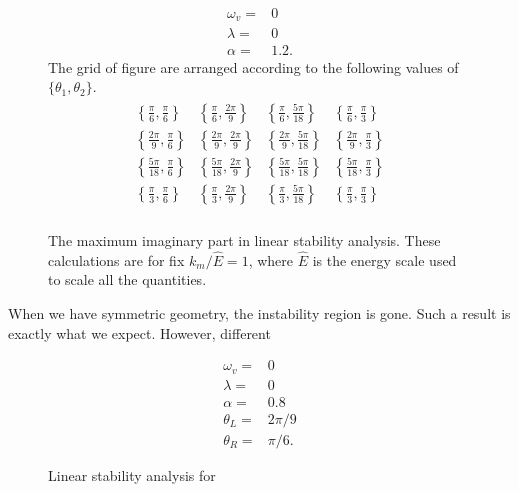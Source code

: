 \documentclass[letterpaper,12pt,english]{sphinxmanual}
\begin{document}
\begin{figure}[htbp]
\centering
\capstart

\noindent{}
\caption{The maximum imaginary part in linear stability analysis. These calculations are for fix \(k_m/\hat E=1\), where \(\hat E\) is the energy scale used to scale all the quantities.}{\small \begin{equation*}
\begin{split}\omega_v =& 0\\
\lambda =& 0\\
\alpha = & 1.2.\end{split}
\end{equation*}
The grid of figure are arranged according to the following values of \(\{\theta_1,\theta_2\}\).
\begin{equation*}
\begin{split}\begin{array}{cccc}
\left\{\frac{\pi }{6},\frac{\pi }{6}\right\} & \left\{\frac{\pi }{6},\frac{2 \pi }{9}\right\} & \left\{\frac{\pi }{6},\frac{5 \pi }{18}\right\} & \left\{\frac{\pi }{6},\frac{\pi }{3}\right\} \\
\left\{\frac{2 \pi }{9},\frac{\pi }{6}\right\} & \left\{\frac{2 \pi }{9},\frac{2 \pi }{9}\right\} & \left\{\frac{2 \pi }{9},\frac{5 \pi }{18}\right\} & \left\{\frac{2 \pi }{9},\frac{\pi }{3}\right\} \\
\left\{\frac{5 \pi }{18},\frac{\pi }{6}\right\} & \left\{\frac{5 \pi }{18},\frac{2 \pi }{9}\right\} & \left\{\frac{5 \pi }{18},\frac{5 \pi }{18}\right\} & \left\{\frac{5 \pi }{18},\frac{\pi }{3}\right\} \\
\left\{\frac{\pi }{3},\frac{\pi }{6}\right\} & \left\{\frac{\pi }{3},\frac{2 \pi }{9}\right\} & \left\{\frac{\pi }{3},\frac{5 \pi }{18}\right\} & \left\{\frac{\pi }{3},\frac{\pi }{3}\right\} \\
\end{array}\end{split}
\end{equation*}}\label{\detokenize{collective/fast-modes:id2}}\end{figure}

When we have symmetric geometry, the instability region is gone. Such a result is exactly what we expect. However, different
\begin{figure}[htbp]
\centering
\capstart

\noindent{}
\caption{Linear stability analysis for}{\small \begin{equation*}
\begin{split}\omega_v =& 0\\
\lambda =& 0\\
\alpha = & 0.8 \\
\theta_L =& 2\pi/9 \\
\theta_R =& \pi/6.\end{split}
\end{equation*}}\label{\detokenize{collective/fast-modes:id3}}\end{figure}
\end{document}
